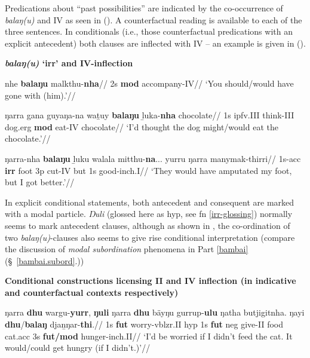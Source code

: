 \xe

Predications about ``past possibilities'' are indicated by the co-occurrence of \textit{balaŋ(u)} and \gls{IV} as seen in (\nextx). A counterfactual reading is available to each of the three sentences. In conditionals (i.e., those counterfactual predications with an explicit antecedent) both clauses are inflected with \gls{IV} -- an example is given in ().


\pex \textbf{\textit{balaŋ(u)} `\gls{irr}' and \gls{IV}-inflection}

\a\begingl\gla nhe \textbf{balaŋu} malkthu-\textbf{nha}//
\glb 2s \textbf{\gls{mod}} accompany-\gls{IV}//
\glft `You should/would have gone with (him).'\trailingcitation{[DhG~20190413]}//\endgl


\a\begingl\gla ŋarra gana guyaŋa-na waṯuy \textbf{balaŋu} ḻuka-\textbf{nha} chocolate//
\glb 1s \gls{ipfv}.\gls{III} think-\gls{III} dog.\gls{erg} \textbf{\gls{mod}} eat-\gls{IV} chocolate//
\glft`I'd thought the dog might/would eat the chocolate.'\trailingcitation{[DhG~20190413]}//\endgl

\a\begingl\gla ŋarra-nha \textbf{balaŋu} ḻuku walala mitthu-\textbf{na}... yurru ŋarra manymak-thirri//
\glb 1s-\gls{acc} \textbf{\gls{irr}} foot 3p cut-\gls{IV} but 1s good-\gls{inch}.\gls{I}//
\glft`They would have amputated my foot, but I got better.'\trailingcitation{[DhG~20190417]}//\endgl
\xe

In explicit conditional statements, both antecedent and consequent are marked with a modal particle. \textit{Ŋuli} (glossed here as \gls{hyp}, see {\sf fn} \ref{irr-glossing}) normally seems to mark antecedent clauses, although as shown in , the co-ordination of two \textit{balaŋ(u)}-clauses also seems to give rise conditional interpretation (compare the discussion of \textit{modal subordination} phenomena in Part \ref{bambai} (\S~\ref{bambai.subord}.))


\pex{} \textbf{Conditional constructions licensing \gls{II} and \gls{IV} inflection (in indicative and counterfactual contexts respectively)} 


\a\begingl\gla ŋarra \textbf{dhu} wargu-\textbf{yurr}, \textbf{ŋuli} ŋarra \textbf{dhu} bäyŋu gurrup-\textbf{ulu} ŋatha butjigitnha. ŋayi \textbf{dhu}/\textbf{balaŋ} djaṉŋar-\textbf{thi}.//
\glb 1s \textbf{\gls{fut}} worry-\gls{vblzr}.\gls{II} \gls{hyp} 1s \textbf{\gls{fut}} \gls{neg} give-\gls{II} food cat.\gls{acc} 3s \textbf{\gls{fut}/\gls{mod}} hunger-\gls{inch}.\gls{II}//
\glft`I'd be worried if I didn't feed the cat. It would/could get hungry (if I didn't.)'\trailingcitation{[AW~20190429]}//\endgl


